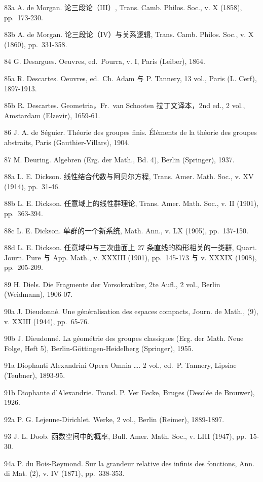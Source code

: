 83a A. de Morgan. 论三段论（III）, Trans. Camb. Philos. Soc., v. X (1858), pp.~173-230.

83b A. de Morgan. 论三段论（IV）与关系逻辑, Trans. Camb. Philos. Soc., v. X (1860), pp.~331-358.

84 G. Desargues. Oeuvres, ed.~Pourra, v. I, Paris (Leiber), 1864.

85a R. Descartes. Oeuvres, ed.~Ch. Adam 与 P. Tannery, 13 vol., Paris (L. Cerf), 1897-1913.

85b R. Descartes. Geometria，Fr.~van Schooten 拉丁文译本，2nd ed., 2 vol., Amstardam (Elzevir), 1659-61.

86 J. A. de Séguier. Théorie des groupes finis. Éléments de la théorie des groupes abstraits, Paris (Gauthier-Villars), 1904.

87 M. Deuring. Algebren (Erg. der Math., Bd. 4), Berlin (Springer), 1937.

88a L. E. Dickson. 线性结合代数与阿贝尔方程, Trans. Amer. Math. Soc., v. XV (1914), pp.~31-46.

88b L. E. Dickson. 任意域上的线性群理论, Trans. Amer. Math. Soc., v. II (1901), pp.~363-394.

88c L. E. Dickson. 单群的一个新系统, Math. Ann., v. LX (1905), pp.~137-150.

88d L. E. Dickson. 任意域中与三次曲面上 27 条直线的构形相关的一类群, Quart. Journ. Pure 与 App. Math., v. XXXIII (1901), pp.~145-173 与 v. XXXIX (1908), pp.~205-209.

89 H. Diels. Die Fragmente der Vorsokratiker, 2te Aufl., 2 vol., Berlin (Weidmann), 1906-07.

90a J. Dieudonné. Une généralisation des espaces compacts, Journ. de Math., (9), v. XXIII (1944), pp.~65-76.

90b J. Dieudonné. La géométrie des groupes classiques (Erg. der Math. Neue Folge, Heft 5), Berlin-Göttingen-Heidelberg (Springer), 1955.

91a Diophanti Alexandrini Opera Omnia \ldots. 2 vol., ed.~P. Tannery, Lipsiae (Teubner), 1893-95.

91b Diophante d'Alexandrie. Transl. P. Ver Eecke, Bruges (Desclée de Brouwer), 1926.

92a P. G. Lejeune-Dirichlet. Werke, 2 vol., Berlin (Reimer), 1889-1897.

93 J. L. Doob. 函数空间中的概率, Bull. Amer. Math. Soc., v. LIII (1947), pp.~15-30.

94a P. du Bois-Reymond. Sur la grandeur relative des infinis des fonctions, Ann. di Mat. (2), v. IV (1871), pp.~338-353.

